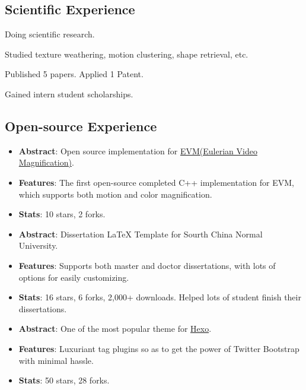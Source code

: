 \documentclass[11pt,a4paper,nolmodern]{moderncv}
\begin{document}
\subsection{Scientific Experience}

{Doing scientific research.
\begin{tightitemize}%
 \item Studied texture weathering, motion clustering, shape retrieval, etc.
 \item Published 5 papers. Applied 1 Patent.
 \item Gained intern student scholarships. 
 \end{tightitemize}}

\subsection{Open-source Experience}

%
  {
\begin{itemize}
\item \textbf{Abstract}: Open source implementation for \href{http://people.csail.mit.edu/mrub/vidmag/}{EVM(Eulerian Video Magnification)}.
\item \textbf{Features}: The first open-source completed C++ implementation for EVM, which supports both motion and color magnification.
\item \textbf{Stats}: 10 stars, 2 forks.
\end{itemize}}

%
  {
\begin{itemize}
\item \textbf{Abstract}: Dissertation LaTeX Template for Sourth China Normal
  University.
\item \textbf{Features}: Supports both master and doctor dissertations, with lots of options for easily customizing.
\item \textbf{Stats}: 16 stars, 6 forks, 2,000+ downloads. Helped lots of
  student finish their dissertations.
\end{itemize}}

%
  {
\begin{itemize}
\item \textbf{Abstract}: One of the most popular theme for \href{hexo.io}{Hexo}.
\item \textbf{Features}: Luxuriant tag plugins so as to get the power of Twitter Bootstrap with minimal hassle.
\item \textbf{Stats}: 50 stars, 28 forks.
\end{itemize}}
\end{document}
